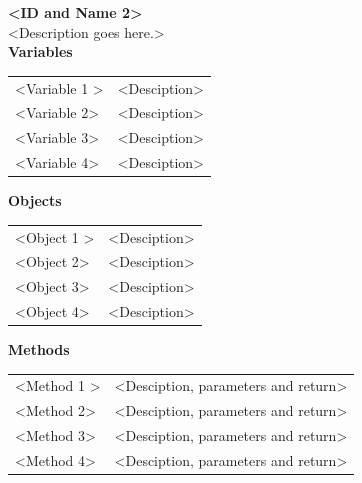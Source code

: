\documentclass [10pt]{article}
\begin{document}
\textbf{<ID and Name 2>} \\

<Description goes here.>  \\

\textbf{Variables} 

\begin{longtable}{ p{ }  p{ }} \\ 

 
\rowcolor{tableCell} <Variable 1 >& <Desciption> \\ 
<Variable 2>& <Desciption> \\

\rowcolor{tableCell}<Variable 3> & <Desciption> \\ 
<Variable 4>& <Desciption> \\

\end{longtable}

\textbf{Objects} 
\begin{longtable}{ p{ }  p{ }} \\ 

 
\rowcolor{tableCell} <Object 1 >& <Desciption> \\ 
<Object 2>& <Desciption> \\

\rowcolor{tableCell}<Object 3> & <Desciption> \\ 
<Object 4>& <Desciption> \\

\end{longtable}


\textbf{Methods} 
\begin{longtable}{ p{ }  p{ }} \\ 

 
\rowcolor{tableCell} <Method 1 >& <Desciption, parameters and return>\\ 
<Method 2>& <Desciption, parameters and return>\\

\rowcolor{tableCell}<Method 3> & <Desciption, parameters and return> \\ 
<Method 4>& <Desciption, parameters and return> \\

\end{longtable}
\end{document}
